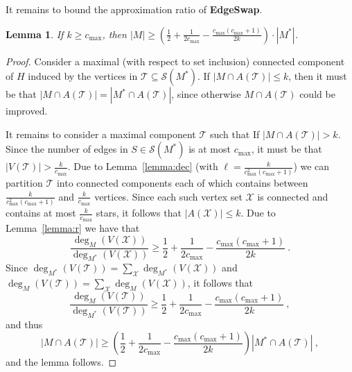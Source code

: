 \documentclass[11pt]{article}
\newtheorem{lemma}{Lemma}
\newcommand{\abs}[1]{\left| #1 \right|}
\newcommand{\paren}[1]{\left( #1 \right)}
\newcommand{\half}{\frac{1}{2}}
\newcommand{\inv}[1]{\frac{1}{#1}}
\newcommand{\cmax}{c_{\max}}
\newcommand{\calS}{\mathcal{S}}
\newcommand{\calT}{\mathcal{T}}
\newcommand{\calX}{\mathcal{X}}
\begin{document}
\iffalse %

\begin{lemma}
Given a parameter $k$, a connected graph $G$ with a maximum degree $d$
can be decomposed into connected components of size at least $k$, and
at most $d(k-1) + 1$.
\end{lemma}

\begin{proof}
We give a constructive proof.  Start constructing a connected
component by adding adjacent vertices one by one to the component and
removing them from the graph.  If at some point, removing a vertex
disconnect the graph, add all the small components (of size less than
$k$) to the constructed component and decompose the large components
(of size at least $k$) recursively.  Note that removing a vertex can
break the graph to at most $d - 1$ additional components.
\end{proof}

\fi %

It remains to bound the approximation ratio of \textbf{EdgeSwap}.

\begin{lemma}
If $k \geq \cmax$, then $\abs{M} \geq (\half + \inv{2\cmax}
- \frac{\cmax(\cmax+1)}{2k}) \cdot \abs{M^*}$.
\end{lemma}
\begin{proof}
Consider a maximal (with respect to set inclusion) connected component
of $H$ induced by the vertices in $\calT \subseteq \calS(M^*)$.
%
If $\abs{M \cap A(\calT)} \leq k$, then it must be that $\abs{M \cap
A(\calT)} = \abs{M^* \cap A(\calT)}$, since otherwise $M \cap
A(\calT)$ could be improved.

It remains to consider a maximal component $\calT$ such that If
$\abs{M \cap A(\calT)} > k$.  Since the number of edges in
$S \in \calS(M^*)$ is at most $\cmax$, it must be that $\abs{V(\calT)}
> \frac{k}{\cmax}$.
%
Due to Lemma~\ref{lemma:dec} (with $\ell
= \frac{k}{\cmax^2(\cmax+1)}$) we can partition $\calT$ into connected
components each of which contains between $\frac{k}{\cmax^2(\cmax+1)}$
and $\frac{k}{\cmax}$ vertices.
%
Since each such vertex set $\calX$ is connected and contains at most
$\frac{k}{\cmax}$ stars, it follows that $\abs{A(\calX)} \leq k$.
%
Due to Lemma~\ref{lemma:r} we have that
\[
\frac{\deg_M(V(\calX))}{\deg_{M^*}(V(\calX))} 
\geq \half + \inv{2\cmax} - \frac{\cmax(\cmax+1)}{2k}
~.
\]
Since $\deg_{M^*}(V(\calT)) = \sum_{\calX} \deg_{M^*}(V(\calX))$ and
$\deg_M(V(\calT)) = \sum_{\calX} \deg_M(V(\calX))$, it follows that
\[
\frac{\deg_M(V(\calT))}{\deg_{M^*}(V(\calT))}
\geq \half + \inv{2\cmax} - \frac{\cmax(\cmax+1)}{2k}
~,
\]
and thus
\[
\abs{M \cap A(\calT)}
\geq \paren{ \half + \inv{2\cmax} -
             \frac{\cmax(\cmax+1)}{2k}} \abs{M^* \cap A(\calT)}
~,
\]
and the lemma follows.
\end{proof}
\end{document}
